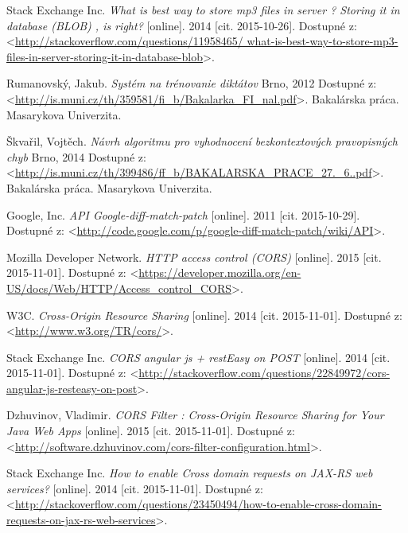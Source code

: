 \documentclass[12pt,oneside]{fithesis2}
\begin{document}
\begin{thebibliography}{59}
  		Stack Exchange Inc.
  		\emph{What is best way to store mp3 files in server ? Storing it in database (BLOB) , is right?}
  		[online].
  		2014
  		[cit. 2015-10-26].
  		Dostupné z: <\url{http://stackoverflow.com/questions/11958465/
  		what-is-best-way-to-store-mp3-files-in-server-storing-it-in-database-blob}>.
  		
  		Rumanovský, Jakub.
  		\emph{Systém na trénovanie diktátov}
  		Brno, 
  		2012
  		Dostupné z: <\url{http://is.muni.cz/th/359581/fi_b/Bakalarka_FI_nal.pdf}>.
  		Bakalárska práca. Masarykova Univerzita.
  		
  		Škvařil, Vojtěch.
  		\emph{Návrh algoritmu pro vyhodnocení bezkontextových pravopisných chyb}
  		Brno, 
  		2014
  		Dostupné z: <\url{http://is.muni.cz/th/399486/ff_b/BAKALARSKA_PRACE_27._6..pdf}>.
  		Bakalárska práca. Masarykova Univerzita.
  		
  		Google, Inc.
  		\emph{API Google-diff-match-patch}
  		[online].
  		2011
  		[cit. 2015-10-29].
  		Dostupné z: <\url{http://code.google.com/p/google-diff-match-patch/wiki/API}>.
  		
  		Mozilla Developer Network.
  		\emph{HTTP access control (CORS)}
  		[online].
  		2015
  		[cit. 2015-11-01].
  		Dostupné z: <\url{https://developer.mozilla.org/en-US/docs/Web/HTTP/Access_control_CORS}>.
  		
  		W3C.
  		\emph{Cross-Origin Resource Sharing}
  		[online].
  		2014
  		[cit. 2015-11-01].
  		Dostupné z: <\url{http://www.w3.org/TR/cors/}>.
  		
  		Stack Exchange Inc.
  		\emph{CORS angular js + restEasy on POST}
  		[online].
  		2014
  		[cit. 2015-11-01].
  		Dostupné z: <\url{http://stackoverflow.com/questions/22849972/cors-angular-js-resteasy-on-post}>.
		  	
  		Dzhuvinov, Vladimir.
  		\emph{CORS Filter : Cross-Origin Resource Sharing for Your Java Web Apps}
  		[online].
  		2015
  		[cit. 2015-11-01].
  		Dostupné z: <\url{http://software.dzhuvinov.com/cors-filter-configuration.html}>.	  		
 		
  		Stack Exchange Inc.
  		\emph{How to enable Cross domain requests on JAX-RS web services?}
  		[online].
  		2014
  		[cit. 2015-11-01].
  		Dostupné z: <\url{http://stackoverflow.com/questions/23450494/how-to-enable-cross-domain-requests-on-jax-rs-web-services}>.
 		

\end{thebibliography}
\end{document}

